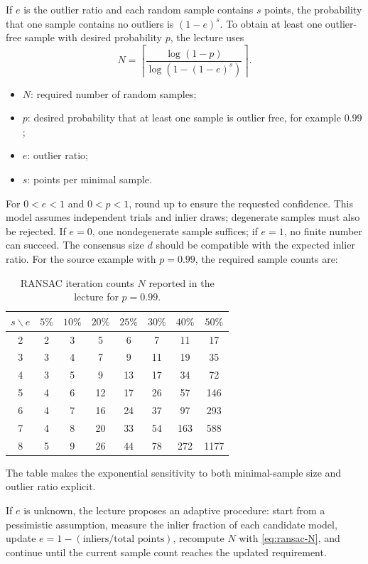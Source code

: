 \documentclass[11pt,a4paper,oneside]{report}
\newcommand{\mathlegend}[1]{%
  \par\vspace{0.2em}{\small\itshape where}\par
  \begin{itemize}[leftmargin=1.7em,topsep=0.15em,itemsep=0.12em]
  #1
  \end{itemize}
}
\begin{document}
If $e$ is the outlier ratio and each random sample contains $s$ points, the probability that one sample contains no outliers is $(1-e)^s$. To obtain at least one outlier-free sample with desired probability $p$, the lecture uses
\begin{equation}
  N=\left\lceil\frac{\log(1-p)}{\log\!\left(1-(1-e)^s\right)}\right\rceil.
  \label{eq:ransac-N}
\end{equation}
\mathlegend{
  \item $N$: required number of random samples;
  \item $p$: desired probability that at least one sample is outlier free, for example $0.99$;
  \item $e$: outlier ratio;
  \item $s$: points per minimal sample.
}
For $0<e<1$ and $0<p<1$, round up to ensure the requested confidence. This model assumes independent trials and inlier draws; degenerate samples must also be rejected. If $e=0$, one nondegenerate sample suffices; if $e=1$, no finite number can succeed. The consensus size $d$ should be compatible with the expected inlier ratio. For the source example with $p=0.99$, the required sample counts are:
\begin{table}[!htbp]
\centering
\caption{RANSAC iteration counts $N$ reported in the lecture for $p=0.99$.}
\label{tab:ransac-iterations}
\small
\begin{tabular}{@{}c*{7}{c}@{}}
\toprule
$s\backslash e$ & $5\%$ & $10\%$ & $20\%$ & $25\%$ & $30\%$ & $40\%$ & $50\%$\\
\midrule
2 & 2 & 3 & 5 & 6 & 7 & 11 & 17\\
3 & 3 & 4 & 7 & 9 & 11 & 19 & 35\\
4 & 3 & 5 & 9 & 13 & 17 & 34 & 72\\
5 & 4 & 6 & 12 & 17 & 26 & 57 & 146\\
6 & 4 & 7 & 16 & 24 & 37 & 97 & 293\\
7 & 4 & 8 & 20 & 33 & 54 & 163 & 588\\
8 & 5 & 9 & 26 & 44 & 78 & 272 & 1177\\
\bottomrule
\end{tabular}
\end{table}
The table makes the exponential sensitivity to both minimal-sample size and outlier ratio explicit.

If $e$ is unknown, the lecture proposes an adaptive procedure: start from a pessimistic assumption, measure the inlier fraction of each candidate model, update $e=1-(\text{inliers}/\text{total points})$, recompute $N$ with \cref{eq:ransac-N}, and continue until the current sample count reaches the updated requirement.
\end{document}
